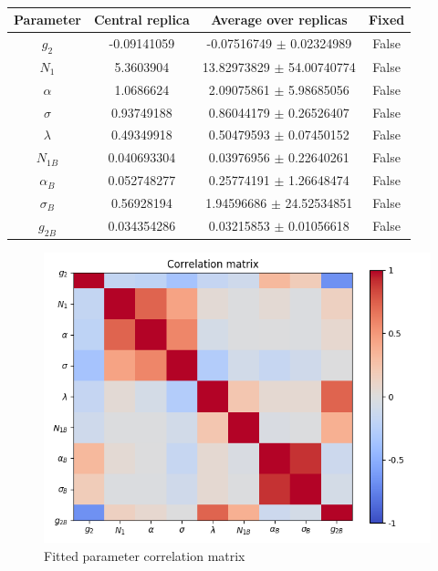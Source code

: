 \documentclass[
]{article}
\begin{document}
\begin{table}[h]

\centering

\begin{tabular}{|c|c|c|c|} \hline

\textbf{Parameter} & \textbf{Central replica} & \textbf{Average over
replicas} & \textbf{Fixed} \\ \hline

\(g_2\) & -0.09141059 & -0.07516749 \(\pm\) 0.02324989 & False \\ \hline
\(N_1\) & 5.3603904 & 13.82973829 \(\pm\) 54.00740774 & False \\ \hline
\(\alpha\) & 1.0686624 & 2.09075861 \(\pm\) 5.98685056 & False \\ \hline
\(\sigma\) & 0.93749188 & 0.86044179 \(\pm\)
0.26526407 & False \\ \hline
\(\lambda\) & 0.49349918 & 0.50479593 \(\pm\)
0.07450152 & False \\ \hline
\(N_{1B}\) & 0.040693304 & 0.03976956 \(\pm\)
0.22640261 & False \\ \hline
\(\alpha_B\) & 0.052748277 & 0.25774191 \(\pm\)
1.26648474 & False \\ \hline
\(\sigma_B\) & 0.56928194 & 1.94596686 \(\pm\)
24.52534851 & False \\ \hline
\(g_{2B}\) & 0.034354286 & 0.03215853 \(\pm\)
0.01056618 & False \\ \hline

\end{tabular}

\caption{}

\end{table}

\begin{figure}
\centering
\includegraphics{pngplots/CorrelationMatrix.png}
\caption{Fitted parameter correlation matrix}
\end{figure}
\end{document}
